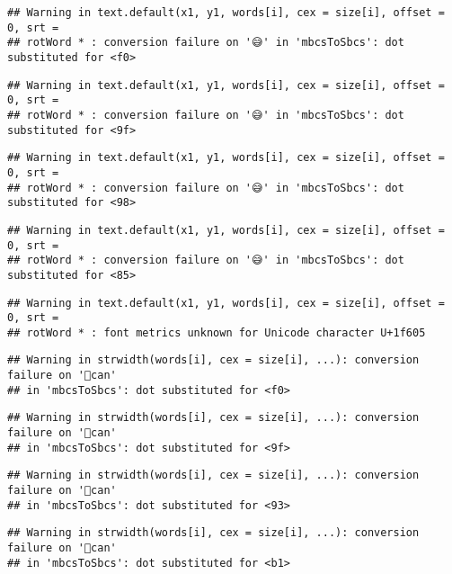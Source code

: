 \documentclass[
]{article}
\begin{document}
\begin{verbatim}
## Warning in text.default(x1, y1, words[i], cex = size[i], offset = 0, srt =
## rotWord * : conversion failure on '😅' in 'mbcsToSbcs': dot substituted for <f0>
\end{verbatim}

\begin{verbatim}
## Warning in text.default(x1, y1, words[i], cex = size[i], offset = 0, srt =
## rotWord * : conversion failure on '😅' in 'mbcsToSbcs': dot substituted for <9f>
\end{verbatim}

\begin{verbatim}
## Warning in text.default(x1, y1, words[i], cex = size[i], offset = 0, srt =
## rotWord * : conversion failure on '😅' in 'mbcsToSbcs': dot substituted for <98>
\end{verbatim}

\begin{verbatim}
## Warning in text.default(x1, y1, words[i], cex = size[i], offset = 0, srt =
## rotWord * : conversion failure on '😅' in 'mbcsToSbcs': dot substituted for <85>
\end{verbatim}

\begin{verbatim}
## Warning in text.default(x1, y1, words[i], cex = size[i], offset = 0, srt =
## rotWord * : font metrics unknown for Unicode character U+1f605
\end{verbatim}

\begin{verbatim}
## Warning in strwidth(words[i], cex = size[i], ...): conversion failure on '📱can'
## in 'mbcsToSbcs': dot substituted for <f0>
\end{verbatim}

\begin{verbatim}
## Warning in strwidth(words[i], cex = size[i], ...): conversion failure on '📱can'
## in 'mbcsToSbcs': dot substituted for <9f>
\end{verbatim}

\begin{verbatim}
## Warning in strwidth(words[i], cex = size[i], ...): conversion failure on '📱can'
## in 'mbcsToSbcs': dot substituted for <93>
\end{verbatim}

\begin{verbatim}
## Warning in strwidth(words[i], cex = size[i], ...): conversion failure on '📱can'
## in 'mbcsToSbcs': dot substituted for <b1>
\end{verbatim}
\end{document}
